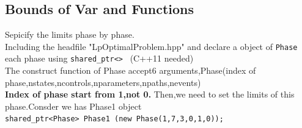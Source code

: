 \documentclass[10pt]{article}
\begin{document}
	\subsection{Bounds of Var and Functions}
    Sepicify the limits phase by phase.\\
    Including the headfile "LpOptimalProblem.hpp" and declare a object of \lstinline|Phase| each phase using \lstinline|shared_ptr<>| \ (C++11 needed)\\
    The construct function of Phase accept6 arguments,Phase(index of phase,nstates,ncontrols,nparameters,npaths,nevents)\\
    \textbf{Index of phase start from 1,not 0.}
    Then,we need to set the limits of this phase.Consder we has Phase1 object\\ \lstinline|shared_ptr<Phase> Phase1 (new Phase(1,7,3,0,1,0));|
\end{document}
